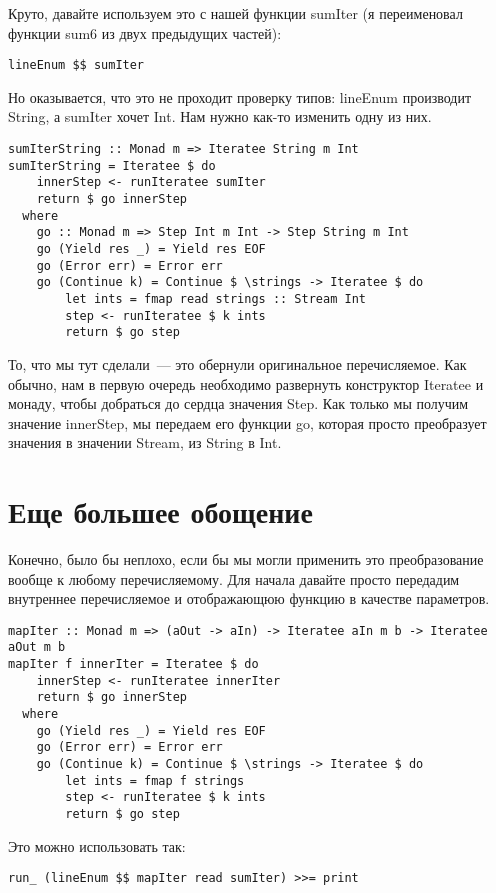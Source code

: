 Круто, давайте используем это с нашей функции sumIter (я переименовал функции sum6 из двух предыдущих частей):
\begin{lstlisting}
lineEnum $$ sumIter
\end{lstlisting}%

Но оказывается, что это не проходит проверку типов: lineEnum производит String, а sumIter хочет Int. Нам нужно как-то изменить одну из них.

\begin{lstlisting}
sumIterString :: Monad m => Iteratee String m Int
sumIterString = Iteratee $ do
    innerStep <- runIteratee sumIter
    return $ go innerStep
  where
    go :: Monad m => Step Int m Int -> Step String m Int
    go (Yield res _) = Yield res EOF
    go (Error err) = Error err
    go (Continue k) = Continue $ \strings -> Iteratee $ do
        let ints = fmap read strings :: Stream Int
        step <- runIteratee $ k ints
        return $ go step
\end{lstlisting}%

То, что мы тут сделали~--- это обернули оригинальное перечисляемое. Как обычно, нам в первую очередь необходимо развернуть конструктор Iteratee и монаду, чтобы добраться до сердца значения Step. Как только мы получим значение innerStep, мы передаем его функции go, которая просто преобразует значения в значении Stream, из String в Int.

\section{Еще большее обощение}

Конечно, было бы неплохо, если бы мы могли применить это преобразование вообще к любому перечисляемому. Для начала давайте просто передадим внутреннее перечисляемое и отображающюю функцию в качестве параметров.

\begin{lstlisting}
mapIter :: Monad m => (aOut -> aIn) -> Iteratee aIn m b -> Iteratee aOut m b
mapIter f innerIter = Iteratee $ do
    innerStep <- runIteratee innerIter
    return $ go innerStep
  where
    go (Yield res _) = Yield res EOF
    go (Error err) = Error err
    go (Continue k) = Continue $ \strings -> Iteratee $ do
        let ints = fmap f strings
        step <- runIteratee $ k ints
        return $ go step
\end{lstlisting}%

Это можно использовать так:

\begin{lstlisting}
run_ (lineEnum $$ mapIter read sumIter) >>= print
\end{lstlisting}%

